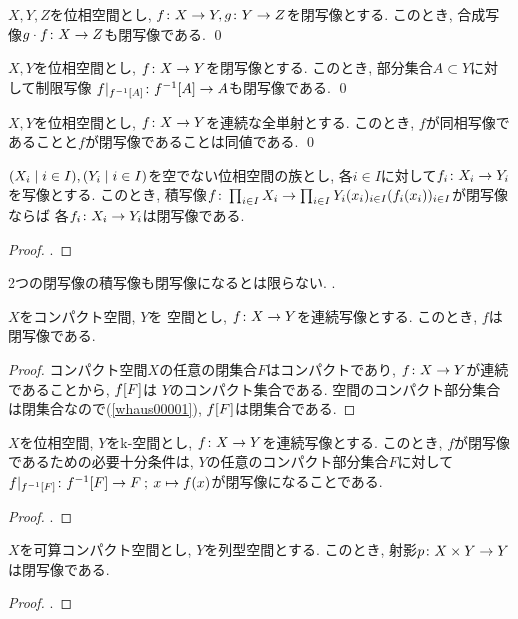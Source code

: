 \documentclass[uplatex, dvipdfmx, a4paper, 12pt, class=jsbook, crop=false]{standalone}
\begin{document}
\begin{proposition}
	$ X, Y, Z $を位相空間とし, $ f\colon X\to Y, g\colon Y\to Z $を閉写像とする.
	このとき, 合成写像$ g \cdot f\colon X\to Z $も閉写像である.
	\qed
\end{proposition}

\begin{proposition}
	$ X, Y $を位相空間とし, $ f\colon X\to Y $を閉写像とする.
	このとき, 部分集合$ A \subset Y $に対して制限写像
	$ \morph{f|_{\mapinvset{f}{A}}}{\mapinvset{f}{A}}{A} $も閉写像である.
	\qed
\end{proposition}

\begin{proposition}
	$ X, Y $を位相空間とし, $ f\colon X\to Y $を連続な全単射とする.
	このとき, $ f $が同相写像であることと$ f $が閉写像であることは同値である.
	\qed
\end{proposition}

\begin{proposition}
	$ \setfamily{X_i}{i \in I}, \setfamily{Y_i}{i \in I} $を空でない位相空間の族とし,
	各$ i \in I $に対して$ f_i\colon X_i\to Y_i $を写像とする.
	このとき, 積写像$ \morph{f}{\prod_{i \in I} X_i}{\prod_{i \in I} Y_i}
	{(x_i)_{i \in I}}{(\mappt{f_i}{x_i})_{i \in I}} $が閉写像ならば
	各$ f_i\colon X_i\to Y_i $は閉写像である.
\end{proposition}

\begin{proof}
	\WIP.
\end{proof}

\begin{example}
	2つの閉写像の積写像も閉写像になるとは限らない.
	\WIP.
\end{example}

\begin{proposition}
	$ X $をコンパクト空間, $ Y $を \Hausdorff 空間とし, $ f\colon X\to Y $を連続写像とする.
	このとき, $ f $は閉写像である.
\end{proposition}

\begin{proof}
	コンパクト空間$ X $の任意の閉集合$ F $はコンパクトであり,
	$ f\colon X\to Y $が連続であることから, $ \mapset{f}{F} $は
	$ Y $のコンパクト集合である.
	\Hausdorff 空間のコンパクト部分集合は閉集合なので(\cref{whaus00001}),
	$ \mapset{f}{F} $は閉集合である.
\end{proof}

\begin{proposition}
	$ X $を位相空間, $ Y $をk-空間とし, $ f\colon X\to Y $を連続写像とする.
	このとき, $ f $が閉写像であるための必要十分条件は, $ Y $の任意のコンパクト部分集合$ F $に対して
	$ \morphto{f|_{\mapinvset{f}{F}}}{\mapinvset{f}{F}}{F}{x}{f(x)} $が閉写像になることである.
\end{proposition}

\begin{proof}
	\WIP.
\end{proof}

\begin{proposition}
	$ X $を可算コンパクト空間とし, $ Y $を列型空間とする. このとき, 射影$ p\colon X \times Y\to Y $は閉写像である.
\end{proposition}

\begin{proof}
	\WIP.
\end{proof}
\end{document}
